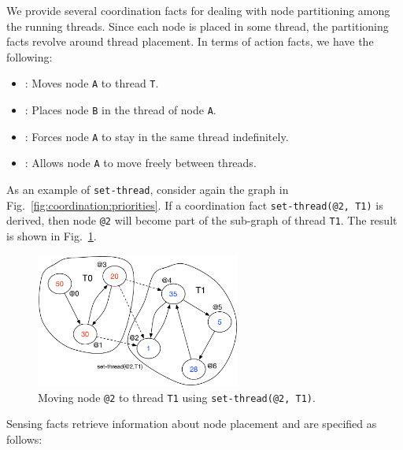 We provide several coordination facts for dealing with node partitioning among
the running threads. Since each node is placed in some thread, the partitioning
facts revolve around thread placement.  In terms of action facts, we have the
following:

\begin{itemize}
   \item {}: Moves node \texttt{A} to thread
   \texttt{T}.

   \item {}: Places node \texttt{B} in
   the thread of node \texttt{A}.

   \item {}: Forces node \texttt{A} to stay in the
   same thread indefinitely.

   \item {}: Allows node \texttt{A} to move freely
   between threads.

\end{itemize}

As an example of \texttt{set-thread}, consider again the graph in
Fig.~\ref{fig:coordination:priorities}. If a coordination fact
\texttt{set-thread(@2, T1)} is derived, then node \texttt{@2} will become part
of the sub-graph of thread \texttt{T1}. The result is shown in
Fig.~\ref{fig:coordination:partitioning}.

\begin{figure}
\begin{center}
   \includegraphics[width=0.6\textwidth]{figures/coordination/partitioning.pdf}
\end{center}
\caption{Moving node \texttt{@2} to thread \texttt{T1} using
   \texttt{set-thread(@2, T1)}.}
\label{fig:coordination:partitioning}
\end{figure}

Sensing facts retrieve information about node placement and are specified as
follows:

